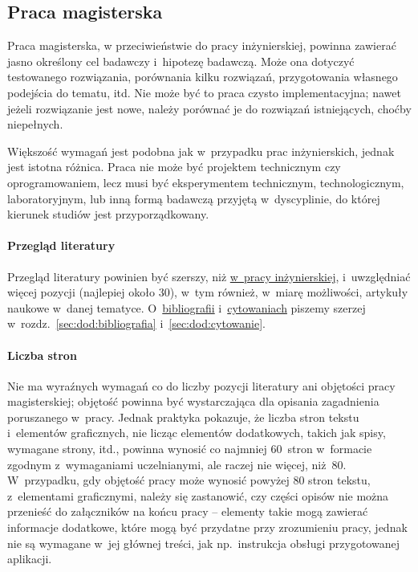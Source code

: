 \subsection{Praca magisterska}
\label{sec:dod:ogolne-praca-magisterska}

Praca magisterska, w przeciwieństwie do pracy inżynierskiej, powinna zawierać jasno określony cel badawczy i~hipotezę badawczą. Może ona dotyczyć testowanego rozwiązania, porównania kilku rozwiązań, przygotowania własnego podejścia do tematu, itd. Nie może być to praca czysto implementacyjna; nawet 
jeżeli rozwiązanie jest nowe, należy porównać je do rozwiązań istniejących, choćby niepełnych.

Większość wymagań jest podobna jak w~przypadku prac inżynierskich, jednak jest istotna różnica. Praca nie może być projektem technicznym czy oprogramowaniem, lecz musi być eksperymentem technicznym, technologicznym, laboratoryjnym, lub inną formą badawczą przyjętą w~dyscyplinie, do której kierunek studiów 
jest przyporządkowany.


\paragraph{Przegląd literatury}
\label{sec:dod:przeglad-literatury-magisterska}

Przegląd literatury powinien być szerszy, niż \hyperref[sec:dod:przeglad-literatury-inzynierska]{w~pracy inżynierskiej}, i~uwzględniać więcej pozycji (najlepiej około 30), w~tym również, w~miarę możliwości, artykuły naukowe w~danej tematyce. O~\hyperref[sec:dod:bibliografia]{bibliografii} i~\hyperref[sec:dod:cytowanie]{cytowaniach} piszemy szerzej w~rozdz.~\ref{sec:dod:bibliografia} i~\ref{sec:dod:cytowanie}. 


\paragraph{Liczba stron}
\label{sec:dod:liczba-stron-magisterskiej}
Nie ma wyraźnych wymagań co do liczby pozycji literatury ani objętości pracy magisterskiej; objętość powinna być wystarczająca dla opisania zagadnienia poruszanego w~pracy. Jednak praktyka pokazuje, że liczba stron tekstu i~elementów graficznych, nie licząc elementów dodatkowych, takich jak spisy, wymagane strony, itd., powinna wynosić co najmniej 60~stron w~formacie zgodnym z~wymaganiami uczelnianymi, ale raczej nie więcej, niż~80. W~przypadku, gdy objętość pracy może wynosić powyżej 80 stron tekstu, z~elementami graficznymi, należy się zastanowić, czy części opisów nie można przenieść do załączników na końcu pracy -- elementy takie mogą zawierać informacje dodatkowe, które mogą być przydatne przy zrozumieniu pracy, jednak nie są wymagane w~jej głównej treści, jak np.\ instrukcja obsługi przygotowanej aplikacji.

